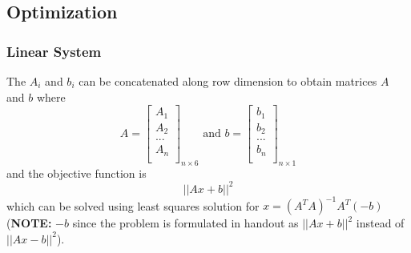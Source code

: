 \documentclass[12pt, a4paper]{article}
\begin{document}
\subsection{Optimization}

\subsubsection{Linear System}

The $A_i$ and $b_i$ can be concatenated along row dimension to obtain matrices $A$ and $b$ where
\[A = \begin{bmatrix}
  A_1 \\
  A_2 \\
  ... \\
  A_n \\
\end{bmatrix}_{n\times 6} \text{ and } b = \begin{bmatrix}
  b_1 \\
  b_2 \\
  ... \\
  b_n \\
\end{bmatrix}_{n\times 1}\]
and the objective function is
\[||Ax + b||^2\]
which can be solved using least squares solution for $x = (A^TA)^{-1}A^T(-b)$ (\textbf{NOTE:} $-b$ since the problem is formulated in handout as $||Ax+b||^2$ instead of $||Ax-b||^2$).
\end{document}
